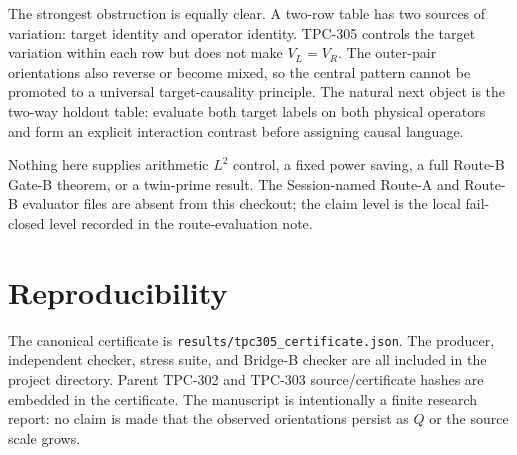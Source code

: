 \documentclass[11pt]{article}
\begin{document}
The strongest obstruction is equally clear.  A two-row table has two sources
of variation: target identity and operator identity.  TPC-305 controls the
target variation within each row but does not make $V_L=V_R$.  The outer-pair
orientations also reverse or become mixed, so the central pattern cannot be
promoted to a universal target-causality principle.  The natural next object is
the two-way holdout table: evaluate both target labels on both physical
operators and form an explicit interaction contrast before assigning causal
language.

Nothing here supplies arithmetic $L^2$ control, a fixed power saving, a full
Route-B Gate-B theorem, or a twin-prime result.  The Session-named Route-A and
Route-B evaluator files are absent from this checkout; the claim level is the
local fail-closed level recorded in the route-evaluation note.

\section*{Reproducibility}

The canonical certificate is
\texttt{results/tpc305\_certificate.json}.  The producer,
independent checker, stress suite, and Bridge-B checker are all included in
the project directory.  Parent TPC-302 and TPC-303 source/certificate hashes
are embedded in the certificate.  The manuscript is intentionally a finite
research report: no claim is made that the observed orientations persist as
$Q$ or the source scale grows.



\end{document}
